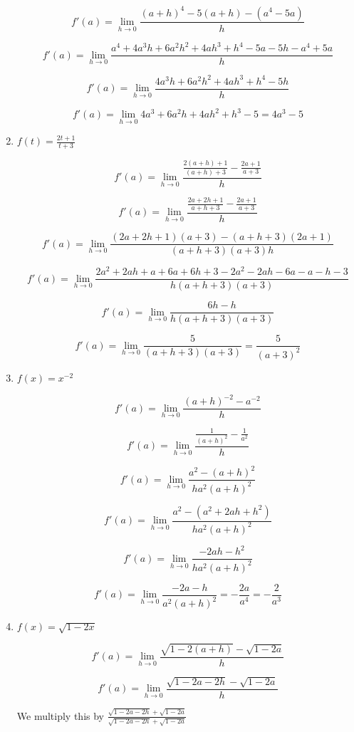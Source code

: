 \documentclass{article}
\begin{document}
\begin{enumerate}
			$$f'(a) = \lim \limits _{h \to 0} \frac{(a+h)^4 - 5(a+h) - (a^4 - 5a)}{h}$$

			$$f'(a) = \lim \limits _{h \to 0} \frac{a^4+4a^3h+6a^2h^2+4ah^3+h^4-5a-5h-a^4+5a}{h}$$

			$$f'(a) = \lim \limits _{h \to 0} \frac{4a^3h + 6a^2h^2 + 4ah^3 + h^4 - 5h}{h}$$

			$$f'(a) = \lim \limits _{h \to 0} 4a^3 + 6a^2h + 4ah^2 + h^3 - 5 = 4a^3 - 5$$

		\item $f(t) = \frac{2t+1}{t+3}$

			$$f'(a) = \lim \limits _{h \to 0} \frac{ \frac{2(a+h)+1}{(a+h)+3} - \frac{2a+1}{a+3}}{h}$$

			$$f'(a) = \lim \limits _{h \to 0} \frac{ \frac{2a + 2h + 1}{a + h + 3} - \frac{2a+1}{a+3} }{h}$$

			$$f'(a) = \lim \limits _{h \to 0} \frac{(2a+2h+1)(a+3) - (a+h+3)(2a+1)}{(a+h+3)(a+3)h}$$

			$$f'(a) = \lim \limits _{h \to 0} \frac{2a^2+2ah+a+6a+6h+3-2a^2-2ah-6a-a-h-3}{h(a+h+3)(a+3)}$$

			$$f'(a) = \lim \limits _{h \to 0} \frac{6h-h}{h(a+h+3)(a+3)}$$

			$$f'(a) = \lim \limits _{h \to 0} \frac{5}{(a+h+3)(a+3)} = \frac{5}{(a+3)^2}$$

		\item $f(x) = x^{-2}$

			$$f'(a) = \lim \limits _{h \to 0} \frac{(a+h)^{-2} - a^{-2}}{h}$$

			$$f'(a) = \lim \limits _{h \to 0} \frac{ \frac{1}{(a+h)^2} - \frac{1}{a^2} }{h}$$

			$$f'(a) = \lim \limits _{h \to 0} \frac{ a^2 - (a+h)^2 }{ha^2(a+h)^2}$$

			$$f'(a) = \lim \limits _{h \to 0} \frac{a^2 - (a^2+2ah+h^2)}{ha^2(a+h)^2}$$

			$$f'(a) = \lim \limits _{h \to 0} \frac{-2ah-h^2}{ha^2(a+h)^2}$$

			$$f'(a) = \lim \limits _{h \to 0} \frac{-2a-h}{a^2(a+h)^2} = - \frac{2a}{a^4} = - \frac{2}{a^3}$$			

		\item $f(x) = \sqrt{1-2x}$

			$$f'(a) = \lim \limits _{h \to 0} \frac{\sqrt{1-2(a+h)} - \sqrt{1-2a}}{h}$$

			$$f'(a) = \lim \limits _{h \to 0} \frac{\sqrt{1-2a-2h} - \sqrt{1-2a}}{h}$$

			We multiply this by $\frac{ \sqrt{1-2a-2h} + \sqrt{1-2a} }{ \sqrt{1-2a-2h} + \sqrt{1-2a}}$


\end{enumerate}
\end{document}
